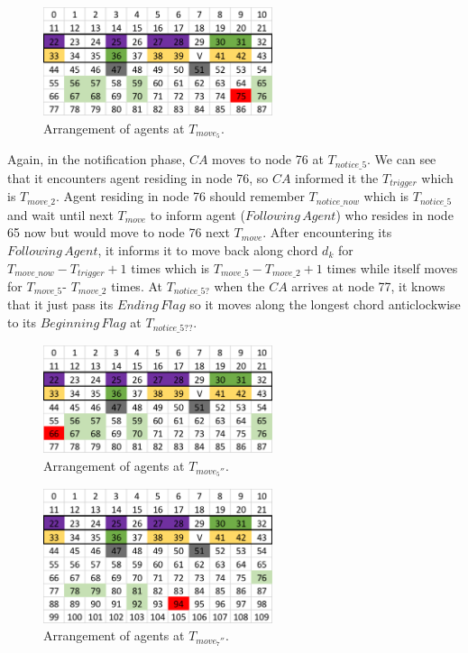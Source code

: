 \begin{figure}[H]
  \centering  
  \includegraphics[width=0.6\textwidth]{figures/T75.png}
  \caption{Arrangement of agents at $T_{move_5}$. }\label{fig:T75}
\end{figure}
Again, in the notification phase, $CA$ moves to node 76 at $T_{notice\_5}$. We can see that it encounters agent residing in node 76, so $CA$ informed it the $T_{trigger}$ which is $T_{move\_2}$. Agent residing in node 76 should remember $T_{notice\_now}$ which is $T_{notice\_5}$ and wait until next $T_{move}$ to inform agent ($Following\,Agent$) who resides in node 65 now but would move to node 76 next $T_{move}$. After encountering its $Following\,Agent$, it informs it to move back along chord $d_k$ for $T_{move\_now}-T_{trigger} +1$ times which is $T_{move\_5}- T_{move\_2}+1$ times while itself moves for $T_{move\_5}$- $T_{move\_2}$ times. 
At $T_{notice\_5?}$ when the $CA$ arrives at node 77, it knows that it just pass its $Ending\,Flag$ so it moves along the longest chord anticlockwise to its $Beginning\,Flag$ at $T_{notice\_5??}$.
\begin{figure}[H]
  \centering  
  \includegraphics[width=0.6\textwidth]{figures/T66.png}
  \caption{Arrangement of agents at $T_{move_5''}$. }\label{fig:T66}
\end{figure}

\begin{figure}[H]
  \centering  
  \includegraphics[width=0.6\textwidth]{figures/T94.png}
  \caption{Arrangement of agents at $T_{move_7''}$. }\label{fig:T94}
\end{figure}

